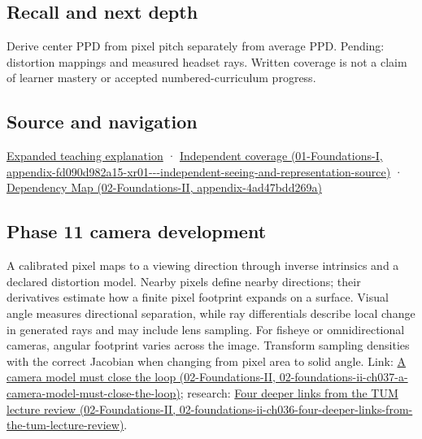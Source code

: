 \subsection{Recall and next depth}\label{appendix-7d356c396d1a-recall-and-next-depth}

Derive center PPD from pixel pitch separately from average PPD. Pending: distortion mappings and measured headset rays. Written coverage is not a claim of learner mastery or accepted numbered-curriculum progress.

\subsection{Source and navigation}\label{appendix-7d356c396d1a-source-and-navigation}

\hyperref[04-visual-computing-ii-ch042-angles-connect-display-samples-to-a-viewer]{Expanded teaching explanation} · \href{../01-Foundations-I/main.pdf\#nameddest=appendix-fd090d982a15-xr01---independent-seeing-and-representation-source}{Independent coverage (01-Foundations-I, appendix-fd090d982a15-xr01-\/-\/-independent-seeing-and-representation-source)} · \href{../02-Foundations-II/main.pdf\#nameddest=appendix-4ad47bdd269a}{Dependency Map (02-Foundations-II, appendix-4ad47bdd269a)}

\subsection{Phase 11 camera development}\label{appendix-7d356c396d1a-phase-11-camera-development}

A calibrated pixel maps to a viewing direction through inverse intrinsics and a declared distortion model. Nearby pixels define nearby directions; their derivatives estimate how a finite pixel footprint expands on a surface. Visual angle measures directional separation, while ray differentials describe local change in generated rays and may include lens sampling. For fisheye or omnidirectional cameras, angular footprint varies across the image. Transform sampling densities with the correct Jacobian when changing from pixel area to solid angle. Link: \href{../02-Foundations-II/main.pdf\#nameddest=02-foundations-ii-ch037-a-camera-model-must-close-the-loop}{A camera model must close the loop (02-Foundations-II, 02-foundations-ii-ch037-a-camera-model-must-close-the-loop)}; research: \href{../02-Foundations-II/main.pdf\#nameddest=02-foundations-ii-ch036-four-deeper-links-from-the-tum-lecture-review}{Four deeper links from the TUM lecture review (02-Foundations-II, 02-foundations-ii-ch036-four-deeper-links-from-the-tum-lecture-review)}.
